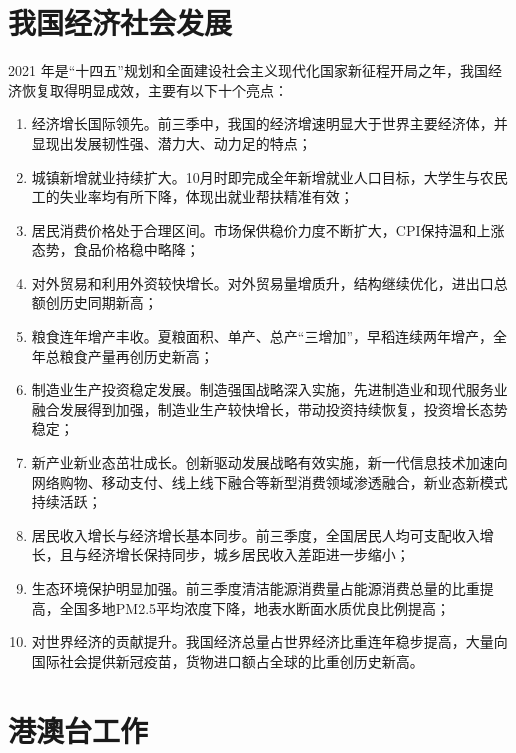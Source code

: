 \documentclass[12pt]{ctexrep}
\begin{document}
    \chapter{我国经济社会发展}

    2021 年是“十四五”规划和全面建设社会主义现代化国家新征程开局之年，我国经济恢复取得明显成效，主要有以下十个亮点\cite{cit2.1}：
    \begin{enumerate}
        \item 经济增长国际领先。前三季中，我国的经济增速明显大于世界主要经济体，并显现出发展韧性强、潜力大、动力足的特点；
        \item 城镇新增就业持续扩大。10月时即完成全年新增就业人口目标，大学生与农民工的失业率均有所下降，体现出就业帮扶精准有效；
        \item 居民消费价格处于合理区间。市场保供稳价力度不断扩大，CPI保持温和上涨态势，食品价格稳中略降；
        \item 对外贸易和利用外资较快增长。对外贸易量增质升，结构继续优化，进出口总额创历史同期新高；
        \item 粮食连年增产丰收。夏粮面积、单产、总产“三增加”，早稻连续两年增产，全年总粮食产量再创历史新高；
        \item 制造业生产投资稳定发展。制造强国战略深入实施，先进制造业和现代服务业融合发展得到加强，制造业生产较快增长，带动投资持续恢复，投资增长态势稳定；
        \item 新产业新业态茁壮成长。创新驱动发展战略有效实施，新一代信息技术加速向网络购物、移动支付、线上线下融合等新型消费领域渗透融合，新业态新模式持续活跃；
        \item 居民收入增长与经济增长基本同步。前三季度，全国居民人均可支配收入增长，且与经济增长保持同步，城乡居民收入差距进一步缩小；
        \item 生态环境保护明显加强。前三季度清洁能源消费量占能源消费总量的比重提高，全国多地PM2.5平均浓度下降，地表水断面水质优良比例提高；
        \item 对世界经济的贡献提升。我国经济总量占世界经济比重连年稳步提高，大量向国际社会提供新冠疫苗，货物进口额占全球的比重创历史新高。
    \end{enumerate}

    \chapter{港澳台工作}
\end{document}

